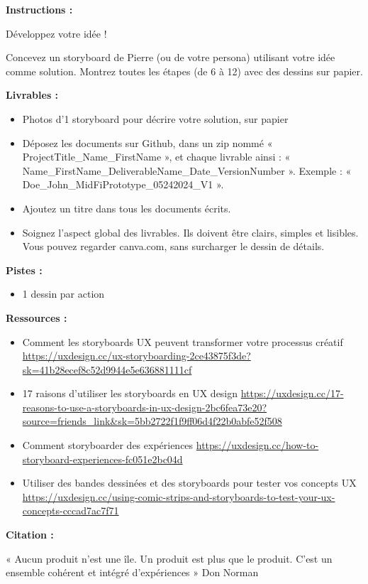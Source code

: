 \makeheaderfiles

\textbf{Instructions :}

Développez votre idée !

Concevez un storyboard de Pierre (ou de votre persona) utilisant votre idée comme solution. Montrez toutes les étapes (de 6 à 12) avec des dessins sur papier.

\textbf{Livrables :}

\begin{itemize}
\item Photos d'1 storyboard pour décrire votre solution, sur papier
\item Déposez les documents sur Github, dans un zip nommé « ProjectTitle\_Name\_FirstName », et chaque livrable ainsi : « Name\_FirstName\_DeliverableName\_Date\_VersionNumber ». Exemple : « Doe\_John\_MidFiPrototype\_05242024\_V1 ».
\item Ajoutez un titre dans tous les documents écrits.
\item Soignez l'aspect global des livrables. Ils doivent être clairs, simples et lisibles. Vous pouvez regarder canva.com, sans surcharger le dessin de détails.
\end{itemize}

\textbf{Pistes :}

\begin{itemize}
\item 1 dessin par action
\end{itemize}

\textbf{Ressources :}

\begin{itemize}
\item Comment les storyboards UX peuvent transformer votre processus créatif \url{https://uxdesign.cc/ux-storyboarding-2ce43875f3de?sk=41b28ecef8c52d9944e5e636881111cf}
\item 17 raisons d'utiliser les storyboards en UX design \url{https://uxdesign.cc/17-reasons-to-use-a-storyboards-in-ux-design-2bc6fea73e20?source=friends_link&sk=5bb2722f1f9ff06d4f22b0abfe52f508}
\item Comment storyboarder des expériences \url{https://uxdesign.cc/how-to-storyboard-experiences-fc051e2bc04d}
\item Utiliser des bandes dessinées et des storyboards pour tester vos concepts UX \url{https://uxdesign.cc/using-comic-strips-and-storyboards-to-test-your-ux-concepts-cccad7ac7f71}
\end{itemize}

\textbf{Citation :}

« Aucun produit n'est une île. Un produit est plus que le produit. C'est un ensemble cohérent et intégré d'expériences » Don Norman

